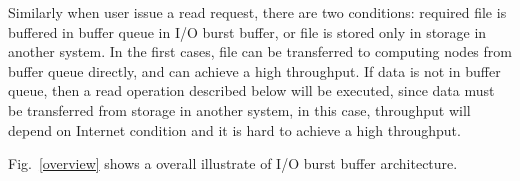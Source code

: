 Similarly when user issue a read request, there are two conditions: required file is buffered in buffer queue in I/O burst buffer, or file is stored only in storage in another system.
In the first cases, file can be transferred to computing nodes from buffer queue directly, and can achieve a high throughput.
If data is not in buffer queue, then a read operation described below will be executed, since data must be transferred from storage in another system, in this case, throughput will depend on Internet condition and it is hard to achieve a high throughput.

Fig.~\ref{overview} shows a overall illustrate of I/O burst buffer architecture.